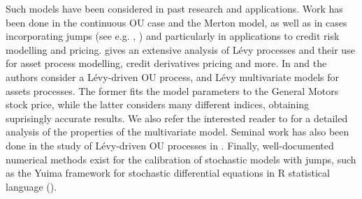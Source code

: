 \documentclass[11pt,reqno]{article}
\theoremstyle{definition}
\begin{document}
\par Such models have been considered in past research and applications. Work has been done in the continuous OU case and the Merton model, as well as in cases incorporating jumps (see e.g. \cite{barndorff2001non}, \cite{hull2004merton}) and particularly in applications to credit risk modelling and pricing. \cite{schoutens2010levy} gives an extensive analysis of L\'evy processes and their use for asset process modelling, credit derivatives pricing and more. In \cite{onalan2009financial} and \cite{luciano2006multivariate} the authors consider a L\'evy-driven OU process, and L\'evy multivariate models for assets processes. The former fits the model parameters to the General Motors stock price, while the latter considers many different indices, obtaining suprisingly accurate results. We also refer the interested reader to \cite{ballotta2016multivariate} for a detailed analysis of the properties of the multivariate model. Seminal work has also been done in the study of L\'evy-driven OU processes in \cite{barndorff2001non}.
Finally, well-documented numerical methods exist for the calibration of stochastic models with jumps, such as the Yuima framework for stochastic differential equations in R statistical language (\cite{brouste2014yuima}).
\end{document}
